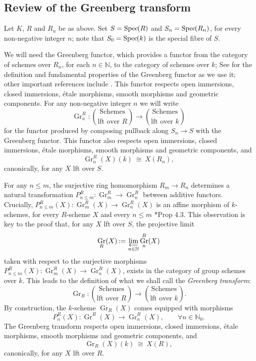 \documentclass{amsart}
\theoremstyle{plain}
\theoremstyle{definition}
\theoremstyle{remark}
\newcommand{\NN}{{\mathbb{N}}}
\newcommand{\Fq}{k}
\DeclareMathOperator{\Gr}{Gr}
\newcommand{\Spec}[1]{{\operatorname{Spec}\hskip-1pt( #1 )}}
\newcommand{\ceq}{{\, :=\, }}
\newcommand{\iso}{{\ \cong\ }}
\newcommand{\partop}[2]{\genfrac{(}{)}{0pt}{0}{#1}{#2}}
\begin{document}
\subsection{Review of the Greenberg transform}

Let $K$, $R$ and $R_n$ be as above.
Set $S = \Spec{R}$ and $S_n = \Spec{R_n}$, for every non-negative integer $n$;
note that $S_0 = \Spec{\Fq}$ is the special fibre of $S$.

We will need the Greenberg functor, which provides
a functor from the category of schemes 
over $R_n$, for each $n\in \NN$, to the category of schemes over $\Fq$;
See \cite{bertrapelle-gonzales:Greenberg} for the definition and fundamental properties of the Greenberg functor as we use it; other important references include
.
This functor respects open immersions, closed immersions, \'etale morphisms, smooth morphisms and geometric components.
%
For any non-negative integer $n$ we will write
\[
\Gr^R_n : \partop{\text{Schemes}}{\text{lft over $R$}} \to \partop{\text{Schemes}}{\text{lft over $\Fq$}}
\]
for the functor produced by composing pullback along $S_n \to S$ with the Greenberg functor. 
This functor also respects open immersions, closed immersions, \'etale morphisms, smooth morphisms and geometric components, and
\[
\Gr^R_n(X)(\Fq) \iso X(R_n),
\]
canonically, for any $X$ lft over $S$.

For any $n\leq m$,  the surjective ring homomorphism $R_{m} \to R_n$ determines a
natural transformation $P^R_{n\leq m} : \Gr^R_{m} \to \Gr^R_n$ between additive functors.
Crucially, $P^R_{n\leq m}(X): \Gr^R_{m}(X)\to \Gr^R_n(X)$ is an affine morphism of $\Fq$-schemes, for every $R$-scheme $X$ and every $n\leq m$ \cite{bertrapelle-gonzales:Greenberg}*{Prop 4.3}.
This observation is key to the proof that, for any $X$ lft over $S$, the projective limit 
\[
\Gr_R(X) \ceq \varprojlim_{n\in \NN} \Gr^R_n(X)
\]
taken with respect to the surjective morphisms $P^R_{n\leq m}(X) : \Gr^R_{m}(X) \to \Gr^R_n(X)$,
exists in the category of group schemes over $\Fq$.
This leads to the definition of what we shall call the {\it Greenberg transform}:
\[
\Gr_R : \partop{\text{Schemes}}{\text{lft over $R$}} \to \partop{\text{Schemes}}{\text{lft over $\Fq$}}.
\]
By construction, the $\Fq$-scheme $\Gr_R(X)$ comes equipped with morphisms 
\[
P^R_n(X) : \Gr^R(X) \to \Gr^R_n(X),\qquad \forall n\in \NN_0.
\]
The Greenberg transform respects open immersions, closed immersions, \'etale morphisms, smooth morphisms and geometric components, and
\[
\Gr_R(X)(\Fq) \iso X(R),
\]
canonically, for any $X$ lft over $R$.
\end{document}
